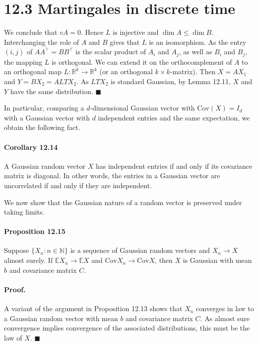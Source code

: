 \documentclass{article}
\begin{document}
\section*{12.3 Martingales in discrete time}

We conclude that $vA = 0$. Hence $L$ is injective and $\dim A \leq \dim B$. Interchanging the role of $A$ and $B$ gives that $L$ is an isomorphism. As the entry $(i, j)$ of $AA^\top = BB^\top$ is the scalar product of $A_i$ and $A_j$, as well as $B_i$ and $B_j$, the mapping $L$ is orthogonal. We can extend it on the orthocomplement of $A$ to an orthogonal map $L: \mathbb{R}^k \rightarrow \mathbb{R}^k$ (or an orthogonal $k \times k$-matrix). Then $X = AX_1$ and $Y = BX_2 = ALTX_2$. As $LT X_2$ is standard Gaussian, by Lemma 12.11, $X$ and $Y$ have the same distribution. \hfill $\blacksquare$

In particular, comparing a $d$-dimensional Gaussian vector with $\text{Cov}(X) = I_d$ with a Gaussian vector with $d$ independent entries and the same expectation, we obtain the following fact.

\paragraph{Corollary 12.14} A Gaussian random vector $X$ has independent entries if and only if its covariance matrix is diagonal. In other words, the entries in a Gaussian vector are uncorrelated if and only if they are independent.

We now show that the Gaussian nature of a random vector is preserved under taking limits.

\paragraph{Proposition 12.15} Suppose $\{X_n : n \in \mathbb{N}\}$ is a sequence of Gaussian random vectors and $X_n \rightarrow X$ almost surely. If $\mathbb{E}X_n \rightarrow \mathbb{E}X$ and $\text{Cov} X_n \rightarrow \text{Cov} X$, then $X$ is Gaussian with mean $b$ and covariance matrix $C$.

\paragraph{Proof.} A variant of the argument in Proposition 12.13 shows that $X_n$ converges in law to a Gaussian random vector with mean $b$ and covariance matrix $C$. As almost sure convergence implies convergence of the associated distributions, this must be the law of $X$. \hfill $\blacksquare$
\end{document}
